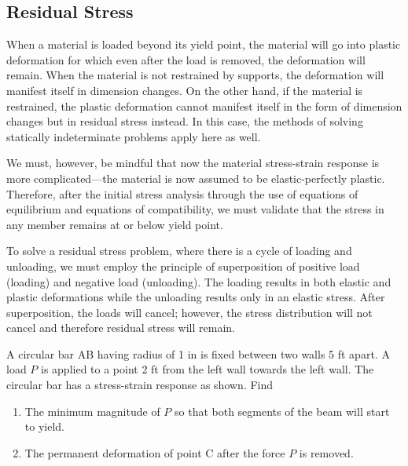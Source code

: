 \documentclass[
10pt,
a4paper,
openany,
svgnames,
]{kaobook} %
\begin{document}
\subsection{Residual Stress}

When a material is loaded beyond its yield point, the material will go into plastic deformation for which even after the load is removed, the deformation will remain. When the material is not restrained by supports, the deformation will manifest itself in dimension changes. On the other hand, if the material is restrained, the plastic deformation cannot manifest itself in the form of dimension changes but in residual stress instead. In this case, the methods of solving statically indeterminate problems apply here as well.

We must, however, be mindful that now the material stress-strain response is more complicated—the material is now assumed to be elastic-perfectly plastic. Therefore, after the initial stress analysis through the use of equations of equilibrium and equations of compatibility, we must validate that the stress in any member remains at or below yield point.

To solve a residual stress problem, where there is a cycle of loading and unloading, we must employ the principle of superposition of positive load (loading) and negative load (unloading). The loading results in both elastic and plastic deformations while the unloading results only in an elastic stress. After superposition, the loads will cancel; however, the stress distribution will not cancel and therefore residual stress will remain.

\begin{example}

  A circular bar AB having radius of 1 in is fixed between two walls 5 ft apart. A load $P$ is applied to a point 2 ft from the left wall towards the left wall. The circular bar has a stress-strain response as shown. Find
  \begin{enumerate}
  \item The minimum magnitude of $P$ so that both segments of the beam will start to yield.
  \item The permanent deformation of point C after the force $P$ is removed.
  \end{enumerate}

\end{example}
\end{document}
